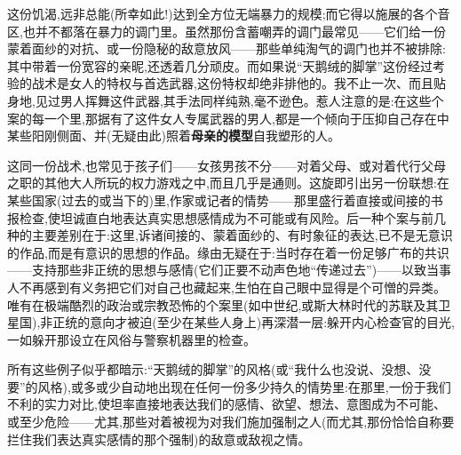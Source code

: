 这份饥渴,远非总能(所幸如此!)达到全方位无端暴力的规模;而它得以施展的各个音区,也并不都落在暴力的调门里。虽然那份含蓄嘲弄的调门最常见——它们给一份蒙着面纱的对抗、或一份隐秘的敌意放风——那些单纯淘气的调门也并不被排除:其中带着一份宽容的亲昵,还透着几分顽皮。而如果说“天鹅绒的脚掌”这份经过考验的战术是女人的特权与首选武器,这份特权却绝非排他的。我不止一次、而且贴身地,见过男人挥舞这件武器,其手法同样纯熟,毫不逊色。惹人注意的是:在这些个案的每一个里\dmark{},那据有了这件女人专属武器的男人,都是一个倾向于压抑自己存在中某些阳刚侧面、并(无疑由此)照着\textbf{母亲的模型}自我塑形的人。

这同一份战术,也常见于孩子们——女孩男孩不分——对着父母、或对着代行父母之职的其他大人所玩的权力游戏之中,而且几乎是通则。这旋即引出另一份联想:在某些国家(过去的或当下的)里,作家或记者的情势——那里盛行着直接或间接的书报检查,使坦诚直白地表达真实思想感情成为不可能或有风险。后一种个案与前几种的主要差别在于:这里,诉诸间接的、蒙着面纱的、有时象征的表达,已不是无意识的作品,而是有意识的思想的作品。缘由无疑在于:当时存在着一份足够广布的共识——支持那些非正统的思想与感情(它们正要不动声色地“传递过去”)——以致当事人不再感到有义务把它们对自己也藏起来,生怕在自己眼中显得是个可憎的异类。唯有在极端酷烈的政治或宗教恐怖的个案里(如中世纪,或斯大林时代的苏联及其卫星国),非正统的意向才被迫(至少在某些人身上)再深潜一层:躲开内心检查官的目光,一如躲开那设立在风俗与警察机器里的检查。

所有这些例子似乎都暗示:“天鹅绒的脚掌”的风格(或“我什么也没说、没想、没要”的风格),或多或少自动地出现在任何一份多少持久的情势里:在那里,一份于我们不利的实力对比,使坦率直接地表达我们的感情、欲望、想法、意图成为不可能、或至少危险——尤其,那些对着被视为对我们施加强制之人(而尤其,那份恰恰自称要拦住我们表达真实感情的那个强制)的敌意或敌视之情。

